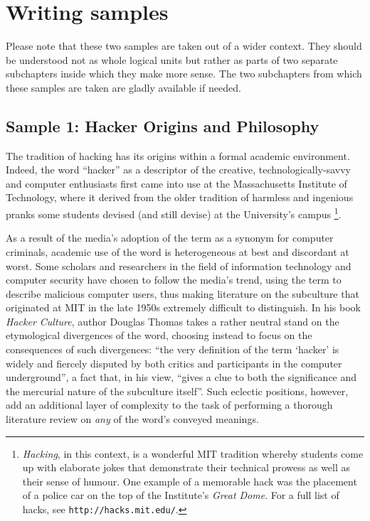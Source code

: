 \section{Writing samples}
\label{samples}

Please note that these two samples are taken out of a wider context. They should be understood not as whole logical units but rather as parts of two separate subchapters inside which they make more sense. The two subchapters from which these samples are taken are gladly available if needed.

\subsection{Sample 1: Hacker Origins and Philosophy}
\label{history}

The tradition of hacking has its origins within a formal academic environment. Indeed, the word ``hacker'' as a descriptor of the creative, technologi\-cal\-ly-savvy and computer enthusiasts first came into use at the Massachusetts Institute of Technology, where it derived from the older tradition of harmless and ingenious pranks some students devised (and still devise) at the University's campus \citep{levy84}\footnote{\textit{Hacking}, in this context, is a wonderful MIT tradition whereby students come up with elaborate jokes that demonstrate their technical prowess as well as their sense of humour. One example of a memorable hack was the placement of a police car on the top of the Institute's \textit{Great Dome}. For a full list of hacks, see \texttt{http://hacks.mit.edu/}.}.

As a result of the media's adoption of the term as a synonym for computer criminals, academic use of the word is heterogeneous at best and discordant at worst. Some scholars and researchers in the field of information technology and computer security have chosen to follow the media's trend, using the term to describe malicious computer users, thus making literature on the subculture that originated at MIT in the late 1950s extremely difficult to distinguish. In his book \textit{Hacker Culture}, author Douglas Thomas \citeyearpar{thomas02} takes a rather neutral stand on the etymological divergences of the word, choosing instead to focus on the consequences of such divergences: ``the very definition of the term `hacker' is widely and fiercely disputed by both critics and participants in the computer underground'', a fact that, in his view, ``gives a clue to both the significance and the mercurial nature of the subculture itself''. Such eclectic positions, however, add an additional layer of complexity to the task of performing a thorough literature review on \textit{any} of the word's conveyed meanings.

